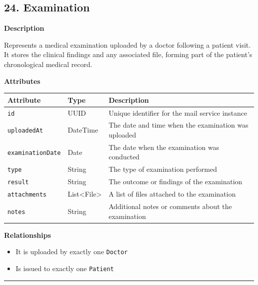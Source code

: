 \documentclass[12pt, a4paper]{article}
\begin{document}
\subsection{24. Examination}\label{sec:24-examination}

\textbf{Description}

Represents a medical examination uploaded by a doctor following a patient visit. It stores the clinical findings and any associated file, forming part of the patient's chronological medical record.

\textbf{Attributes}

\begin{center}
\small
\renewcommand{\arraystretch}{1.35}
\begin{tabularx}{\textwidth}{|>{\raggedright\arraybackslash}p{3.4cm}|>{\raggedright\arraybackslash}p{3.3cm}|Y|}
\hline
{}
\textbf{Attribute} & \textbf{Type} & \textbf{Description} \\ \hline
\texttt{id} & UUID & Unique identifier for the mail service instance \\ \hline
\texttt{uploadedAt} & DateTime & The date and time when the examination was uploaded \\ \hline
\texttt{examinationDate} & Date & The date when the examination was conducted \\ \hline
\texttt{type} & String & The type of examination performed \\ \hline
\texttt{result} & String & The outcome or findings of the examination \\ \hline
\texttt{attachments} & List<File> & A list of files attached to the examination \\ \hline
\texttt{notes} & String & Additional notes or comments about the examination \\ \hline
\end{tabularx}
\end{center}


\textbf{Relationships}

\begin{itemize}
    \item It is uploaded by exactly one \texttt{Doctor}
    \item Is issued to exactly one \texttt{Patient} 
\end{itemize}

\par\medskip\hrule\medskip
\end{document}
